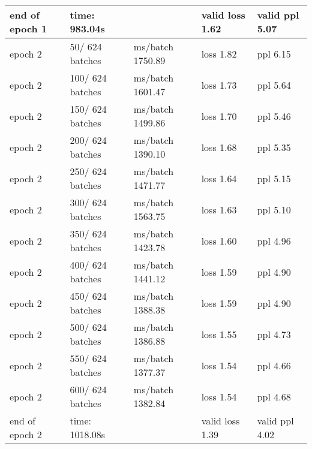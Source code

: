 \begin{center}
\begin{tabular}{ | m{3cm} | m{3cm}| m{4cm} | m{3cm} | m{3cm} | }
end of epoch   1 & time: 983.04s & & valid loss  1.62 & valid ppl     5.07
\\ 
\hline
epoch   2 &    50/  624 batches & ms/batch 1750.89 & loss  1.82 & ppl     6.15\\ 
\hline
epoch   2 &   100/  624 batches & ms/batch 1601.47 & loss  1.73 & ppl     5.64\\ 
\hline
epoch   2 &   150/  624 batches & ms/batch 1499.86 & loss  1.70 & ppl     5.46\\ 
\hline
epoch   2 &   200/  624 batches & ms/batch 1390.10 & loss  1.68 & ppl     5.35\\ 
\hline
epoch   2 &   250/  624 batches & ms/batch 1471.77 & loss  1.64 & ppl     5.15\\ 
\hline
epoch   2 &   300/  624 batches & ms/batch 1563.75 & loss  1.63 & ppl     5.10\\ 
\hline
epoch   2 &   350/  624 batches & ms/batch 1423.78 & loss  1.60 & ppl     4.96\\ 
\hline
epoch   2 &   400/  624 batches & ms/batch 1441.12 & loss  1.59 & ppl     4.90\\ 
\hline
epoch   2 &   450/  624 batches & ms/batch 1388.38 & loss  1.59 & ppl     4.90\\ 
\hline
epoch   2 &   500/  624 batches & ms/batch 1386.88 & loss  1.55 & ppl     4.73\\ 
\hline
epoch   2 &   550/  624 batches & ms/batch 1377.37 & loss  1.54 & ppl     4.66\\ 
\hline
epoch   2 &   600/  624 batches & ms/batch 1382.84 & loss  1.54 & ppl     4.68\\ 
\hline

end of epoch   2 & time: 1018.08s && valid loss  1.39 & valid ppl     4.02
\\ 
\hline
 

\end{tabular}
\end{center}
